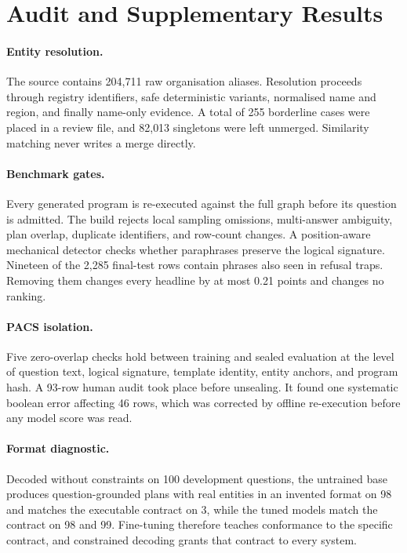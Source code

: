 \documentclass{article}
\begin{document}
\section{Audit and Supplementary Results}
\label{app:audits}

\paragraph{Entity resolution.}
The source contains 204{,}711 raw organisation aliases. Resolution proceeds
through registry identifiers, safe deterministic variants, normalised name and
region, and finally name-only evidence. A total of 255 borderline cases were
placed in a review file, and 82{,}013 singletons were left unmerged. Similarity
matching never writes a merge directly.

\paragraph{Benchmark gates.}
Every generated program is re-executed against the full graph before its
question is admitted. The build rejects local sampling omissions, multi-answer
ambiguity, plan overlap, duplicate identifiers, and row-count changes. A
position-aware mechanical detector checks whether paraphrases preserve the
logical signature. Nineteen of the 2{,}285 final-test rows contain phrases also
seen in refusal traps. Removing them changes every headline by at most 0.21
points and changes no ranking.

\paragraph{PACS isolation.}
Five zero-overlap checks hold between training and sealed evaluation at the
level of question text, logical signature, template identity, entity anchors,
and program hash. A 93-row human audit took place before unsealing. It found one
systematic boolean error affecting 46 rows, which was corrected by offline
re-execution before any model score was read.

\paragraph{Format diagnostic.}
Decoded without constraints on 100 development questions, the untrained
base produces question-grounded plans with real entities in an invented
format on 98 and matches the executable contract on 3, while the tuned
models match the contract on 98 and 99. Fine-tuning therefore teaches
conformance to the specific contract, and constrained decoding grants that
contract to every system.
\end{document}
